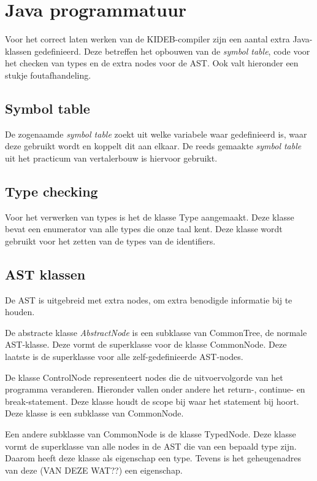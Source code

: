 \chapter{Java programmatuur} %
\label{cha:java_programmatuur}
Voor het correct laten werken van de KIDEB-compiler zijn een aantal extra Java-klassen gedefinieerd. Deze betreffen het opbouwen van de \emph{symbol table}, code voor het checken van types en de extra nodes voor de AST. Ook valt hieronder een stukje foutafhandeling.

\section{Symbol table} %
\label{sec:symbol_table}
De zogenaamde \emph{symbol table} zoekt uit welke variabele waar gedefinieerd is, waar deze gebruikt wordt en koppelt dit aan elkaar. De reeds gemaakte \emph{symbol table} uit het practicum van vertalerbouw is hiervoor gebruikt. 

\section{Type checking} %
\label{sec:type_checking}
Voor het verwerken van types is het de klasse Type aangemaakt. Deze klasse bevat een enumerator van alle types die onze taal kent. Deze klasse wordt gebruikt voor het zetten van de types van de identifiers.

\section{AST klassen} %
\label{sec:ast_klassen}
De AST is uitgebreid met extra nodes, om extra benodigde informatie bij te houden. 

De abstracte klasse \emph{AbstractNode} is een subklasse van CommonTree, de normale AST-klasse. Deze vormt de superklasse voor de klasse CommonNode. Deze laatste is de superklasse voor alle zelf-gedefinieerde AST-nodes. 

De klasse ControlNode representeert nodes die de uitvoervolgorde van het programma veranderen. Hieronder vallen onder andere het return-, continue- en break-statement. Deze klasse houdt de scope bij waar het statement bij hoort. Deze klasse is een subklasse van CommonNode. 

Een andere subklasse van CommonNode is de klasse TypedNode. Deze klasse vormt de superklasse van alle nodes in de AST die van een bepaald type zijn. Daarom heeft deze klasse als eigenschap een type. Tevens is het geheugenadres van deze (VAN DEZE WAT??) een eigenschap.


